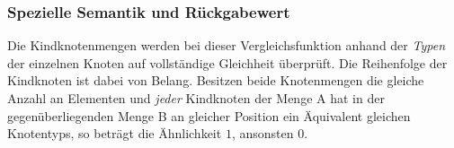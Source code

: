 \subsubsection*{Spezielle Semantik und Rückgabewert}
Die Kindknotenmengen werden bei dieser Vergleichsfunktion anhand der \emph{Typen} der einzelnen Knoten auf vollständige Gleichheit überprüft. Die Reihenfolge der Kindknoten ist dabei von Belang. Besitzen beide Knotenmengen die gleiche Anzahl an Elementen und \emph{jeder} Kindknoten der Menge A hat in der gegenüberliegenden Menge B an gleicher Position ein Äquivalent gleichen Knotentyps, so beträgt die Ähnlichkeit $1$, ansonsten $0$.